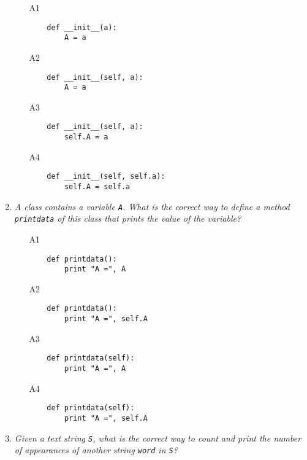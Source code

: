 \begin{enumerate}
\begin{enumerate}
\item[A1] 
\begin{verbatim}
    def __init__(a):
        A = a
\end{verbatim}
\item[A2] 
\begin{verbatim}
    def __init__(self, a):
        A = a
\end{verbatim}
\item[A3] 
\begin{verbatim}
    def __init__(self, a):
        self.A = a
\end{verbatim}
\item[A4] 
\begin{verbatim}
    def __init__(self, self.a):
        self.A = self.a
\end{verbatim}
\end{enumerate}

\vspace{6mm}

\item {\em A class contains a variable {\tt A}. What is the correct way to define 
      a method {\tt printdata} of this class that prints the value of the variable?}\\

\begin{enumerate}
\item[A1] 
\begin{verbatim}
    def printdata():
        print "A =", A
\end{verbatim}
\item[A2] 
\begin{verbatim}
    def printdata():
        print "A =", self.A
\end{verbatim}
\item[A3] 
\begin{verbatim}
    def printdata(self):
        print "A =", A
\end{verbatim}
\item[A4] 
\begin{verbatim}
    def printdata(self):
        print "A =", self.A
\end{verbatim}
\end{enumerate}

\vspace{6mm}

\item {\em Given a text string {\tt S}, what is the correct way to count and print the number 
      of appearances of another string {\tt word} in {\tt S}?}\\


\end{enumerate}
